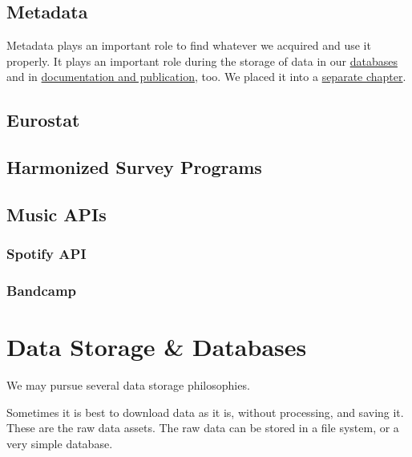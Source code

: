 \documentclass[
  fontsize=13pt,
  english,
  a4paper,
  openany, a4paper, oneside]{article}
\begin{document}
\hypertarget{collect-metadata}{%
\subsection{Metadata}\label{collect-metadata}}

Metadata plays an important role to find whatever we acquired and use it properly. It plays an important role during the storage of data in our \protect\hyperlink{data-storage}{databases} and in \protect\hyperlink{documentation}{documentation and publication}, too. We placed it into a \protect\hyperlink{metadata}{separate chapter}.

\hypertarget{eurostat}{%
\subsection{Eurostat}\label{eurostat}}

\hypertarget{harmonized-survey-programs}{%
\subsection{Harmonized Survey Programs}\label{harmonized-survey-programs}}

\hypertarget{music-apis}{%
\subsection{Music APIs}\label{music-apis}}

\hypertarget{spotify-api}{%
\subsubsection{Spotify API}\label{spotify-api}}

\hypertarget{bandcamp}{%
\subsubsection{Bandcamp}\label{bandcamp}}

\hypertarget{data-storage}{%
\section{Data Storage \& Databases}\label{data-storage}}

We may pursue several data storage philosophies.

Sometimes it is best to download data as it is, without processing, and saving it. These are the raw data assets. The raw data can be stored in a file system, or a very simple database.
\end{document}
